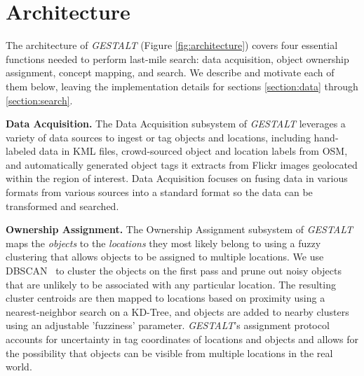 \section{Architecture}
\label{section:architecture}

\begin{figure*}[t]
    
    \centering
    \caption[width=\textwidth]{\emph{GESTALT} consists of a data collection module, an ownership assignment module, a concept mapping module, and a search module.}
    \label{fig:architecture}
\end{figure*}



The architecture of \textit{GESTALT} (Figure \ref{fig:architecture}) covers four essential functions needed to perform last-mile search: data acquisition, object ownership assignment, concept mapping, and search. 
We describe and motivate each of them below, leaving the implementation details for sections \ref{section:data} through \ref{section:search}. 

\textbf{Data Acquisition.}
The Data Acquisition subsystem of \emph{GESTALT} leverages a variety of data sources to ingest or tag objects and locations, including hand-labeled data in KML files, crowd-sourced object and location labels from OSM, and automatically generated object tags it extracts from Flickr images geolocated within the region of interest. 
Data Acquisition focuses on fusing data in various formats from various sources into a standard format so the data can be transformed and searched.

\textbf{Ownership Assignment.}
The Ownership Assignment subsystem of \emph{GESTALT} maps the \textit{objects} to the \textit{locations} they most likely belong to using a fuzzy clustering that allows objects to be assigned to multiple locations. 
We use DBSCAN~\cite{DBSCAN} to cluster the objects on the first pass and prune out noisy objects that are unlikely to be associated with any particular location.
The resulting cluster centroids are then mapped to locations based on proximity using a nearest-neighbor search on a KD-Tree, and objects are added to nearby clusters using an adjustable 'fuzziness' parameter.
\emph{GESTALT}'s assignment protocol accounts for uncertainty in tag coordinates of locations and objects and allows for the possibility that objects can be visible from multiple locations in the real world.

